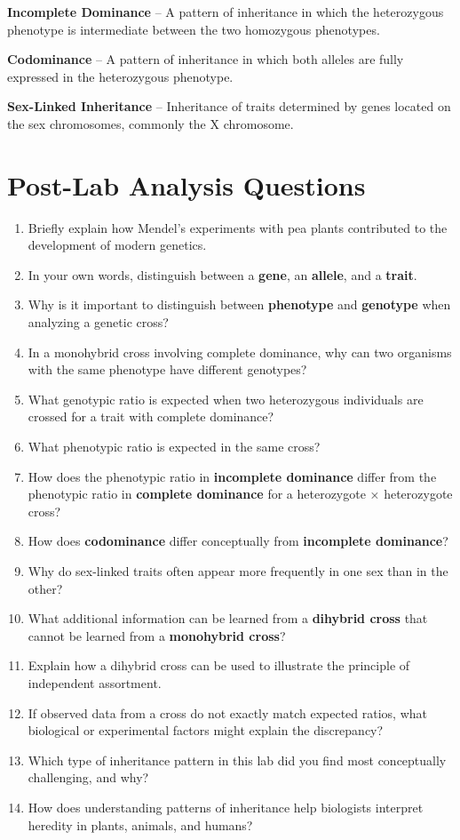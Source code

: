 \documentclass[
  letterpaper,
  DIV=11,
  numbers=noendperiod]{scrreprt}
\begin{document}
\textbf{Incomplete Dominance} -- A pattern of inheritance in which the
heterozygous phenotype is intermediate between the two homozygous
phenotypes.

\textbf{Codominance} -- A pattern of inheritance in which both alleles
are fully expressed in the heterozygous phenotype.

\textbf{Sex-Linked Inheritance} -- Inheritance of traits determined by
genes located on the sex chromosomes, commonly the X chromosome.

\section{\texorpdfstring{\textbf{Post-Lab Analysis
Questions}}{Post-Lab Analysis Questions}}\label{post-lab-analysis-questions}

\begin{enumerate}
\def\labelenumi{\arabic{enumi}.}
\item
  Briefly explain how Mendel's experiments with pea plants contributed
  to the development of modern genetics.
\item
  In your own words, distinguish between a \textbf{gene}, an
  \textbf{allele}, and a \textbf{trait}.
\item
  Why is it important to distinguish between \textbf{phenotype} and
  \textbf{genotype} when analyzing a genetic cross?
\item
  In a monohybrid cross involving complete dominance, why can two
  organisms with the same phenotype have different genotypes?
\item
  What genotypic ratio is expected when two heterozygous individuals are
  crossed for a trait with complete dominance?
\item
  What phenotypic ratio is expected in the same cross?
\item
  How does the phenotypic ratio in \textbf{incomplete dominance} differ
  from the phenotypic ratio in \textbf{complete dominance} for a
  heterozygote × heterozygote cross?
\item
  How does \textbf{codominance} differ conceptually from
  \textbf{incomplete dominance}?
\item
  Why do sex-linked traits often appear more frequently in one sex than
  in the other?
\item
  What additional information can be learned from a \textbf{dihybrid
  cross} that cannot be learned from a \textbf{monohybrid cross}?
\item
  Explain how a dihybrid cross can be used to illustrate the principle
  of independent assortment.
\item
  If observed data from a cross do not exactly match expected ratios,
  what biological or experimental factors might explain the discrepancy?
\item
  Which type of inheritance pattern in this lab did you find most
  conceptually challenging, and why?
\item
  How does understanding patterns of inheritance help biologists
  interpret heredity in plants, animals, and humans?
\end{enumerate}
\end{document}
